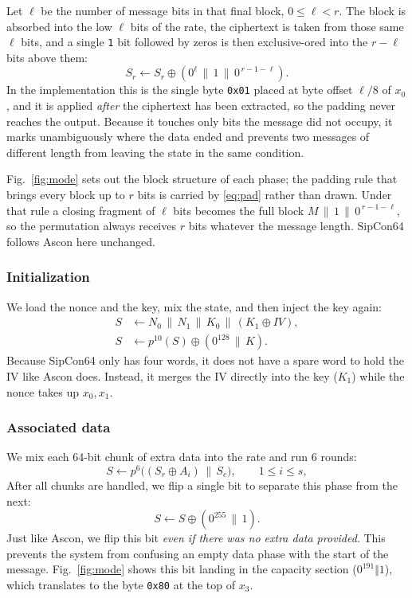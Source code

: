 Let $\ell$ be the number of message bits in that final block, $0 \le \ell < r$.
The block is absorbed into the low $\ell$ bits of the rate, the ciphertext is
taken from those same $\ell$ bits, and a single \texttt{1} bit followed by
zeros is then exclusive-ored into the $r-\ell$ bits above them:
\begin{equation}
S_r \leftarrow S_r \oplus (0^{\ell} \,\|\, 1 \,\|\, 0^{\,r-1-\ell}).
\label{eq:pad}
\end{equation}
In the implementation this is the single byte \texttt{0x01} placed at byte
offset $\ell/8$ of $x_0$, and it is applied \emph{after} the ciphertext has
been extracted, so the padding never reaches the output. Because it touches
only bits the message did not occupy, it marks unambiguously where the data
ended and prevents two messages of different length from leaving the state in
the same condition.

Fig.~\ref{fig:mode} sets out the block structure of each phase; the padding
rule that brings every block up to $r$ bits is carried by \eqref{eq:pad} rather
than drawn. Under that rule a closing fragment of $\ell$ bits becomes the full
block $M \,\|\, 1 \,\|\, 0^{\,r-1-\ell}$, so the permutation always receives
$r$ bits whatever the message length. SipCon64 follows Ascon \cite{caesar} here
unchanged.

\subsubsection{Initialization}
We load the nonce and the key, mix the state, and then inject the key again:
\begin{align}
S &\leftarrow N_0 \,\|\, N_1 \,\|\, K_0 \,\|\, (K_1 \oplus \mathit{IV}),
\nonumber\\
S &\leftarrow p^{10}(S) \oplus (0^{128} \,\|\, K).
\label{eq:init}
\end{align}
Because SipCon64 only has four words, it does not have a spare word to hold the IV like Ascon does. Instead, it merges the IV directly into the key ($K_1$) while the nonce takes up $x_0,x_1$.

\subsubsection{Associated data}
We mix each 64-bit chunk of extra data into the rate and run 6 rounds:
\begin{equation}
S \leftarrow p^{6}\big((S_r \oplus A_i) \,\|\, S_c\big),
\qquad 1 \le i \le s,
\label{eq:ad}
\end{equation}
After all chunks are handled, we flip a single bit to separate this phase from the next:
\begin{equation}
S \leftarrow S \oplus (0^{255} \,\|\, 1).
\label{eq:dsep}
\end{equation}
Just like Ascon, we flip this bit \emph{even if there was no extra data provided}. This prevents the system from confusing an empty data phase with the start of the message. Fig.~\ref{fig:mode} shows this bit landing in the capacity section ($0^{191}\Vert{}1$), which translates to the byte \texttt{0x80} at the top of $x_3$.

